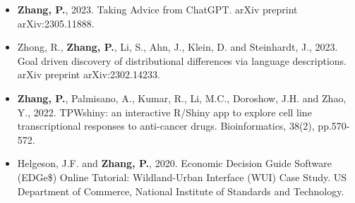 \begin{itemize}
\item \textbf{Zhang, P.}, 2023. Taking Advice from ChatGPT. arXiv preprint arXiv:2305.11888.
\item Zhong, R., \textbf{Zhang, P.}, Li, S., Ahn, J., Klein, D. and Steinhardt, J., 2023. Goal driven discovery of distributional differences via language descriptions. arXiv preprint arXiv:2302.14233.
\item \textbf{Zhang, P.}, Palmisano, A., Kumar, R., Li, M.C., Doroshow, J.H. and Zhao, Y., 2022. TPWshiny: an interactive R/Shiny app to explore cell line transcriptional responses to anti-cancer drugs. Bioinformatics, 38(2), pp.570-572.
\item Helgeson, J.F. and \textbf{Zhang, P.}, 2020. Economic Decision Guide Software (EDGe\$) Online Tutorial: Wildland-Urban Interface (WUI) Case Study. US Department of Commerce, National Institute of Standards and Technology.
\end{itemize}